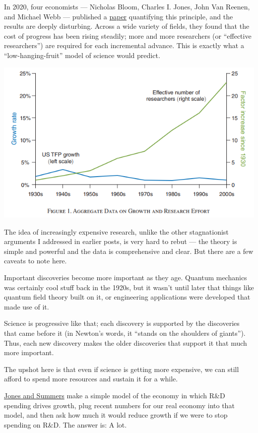 \documentclass[
]{book}
\begin{document}
In 2020, four economists --- Nicholas Bloom, Charles I. Jones, John Van Reenen, and Michael Webb --- published a \href{https://web.stanford.edu/~chadj/IdeaPF.pdf}{paper} quantifying this principle, and the results are deeply disturbing. Across a wide variety of fields, they found that the cost of progress has been rising steadily; more and more researchers (or ``effective researchers'') are required for each incremental advance. This is exactly what a ``low-hanging-fruit'' model of science would predict.

\includegraphics{fig/researchers_TFP.png}

The idea of increasingly expensive research, unlike the other stagnationist arguments I addressed in earlier posts, is very hard to rebut --- the theory is simple and powerful and the data is comprehensive and clear. But there are a few caveats to note here.

Important discoveries become more important as they age. Quantum mechanics was certainly cool stuff back in the 1920s, but it wasn't until later that things like quantum field theory built on it, or engineering applications were developed that made use of it.

Science is progressive like that; each discovery is supported by the discoveries that came before it (in Newton's words, it ``stands on the shoulders of giants''). Thus, each new discovery makes the older discoveries that support it that much more important.

The upshot here is that even if science is getting more expensive, we can still afford to spend more resources and sustain it for a while.

\href{https://www.nber.org/papers/w27863}{Jones and Summers} make a simple model of the economy in which R\&D spending drives growth, plug recent numbers for our real economy into that model, and then ask how much it would reduce growth if we were to stop spending on R\&D. The answer is: A lot.
\end{document}
